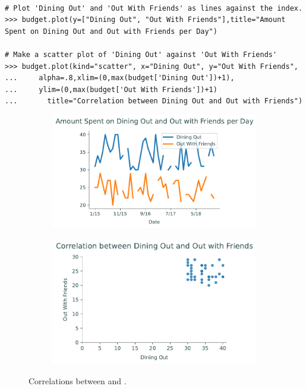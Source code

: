 \begin{lstlisting}

# Plot 'Dining Out' and 'Out With Friends' as lines against the index.
>>> budget.plot(y=["Dining Out", "Out With Friends"],title="Amount Spent on Dining Out and Out with Friends per Day")

# Make a scatter plot of 'Dining Out' against 'Out With Friends'
>>> budget.plot(kind="scatter", x="Dining Out", y="Out With Friends",
... 	alpha=.8,xlim=(0,max(budget['Dining Out'])+1),
...		ylim=(0,max(budget['Out With Friends'])+1)
...       title="Correlation between Dining Out and Out with Friends")
\end{lstlisting}

\begin{figure}[H] 
\captionsetup[subfigure]{justification=centering}
\centering
\begin{subfigure}{.49\textwidth}
    \includegraphics[width=\textwidth]{figures/line_compare.pdf}
\end{subfigure}
%
\begin{subfigure}{.49\textwidth}
    \includegraphics[width=\textwidth]{figures/scatter_compare.pdf}
\end{subfigure}
\caption{Correlations between  and .}
\end{figure}

